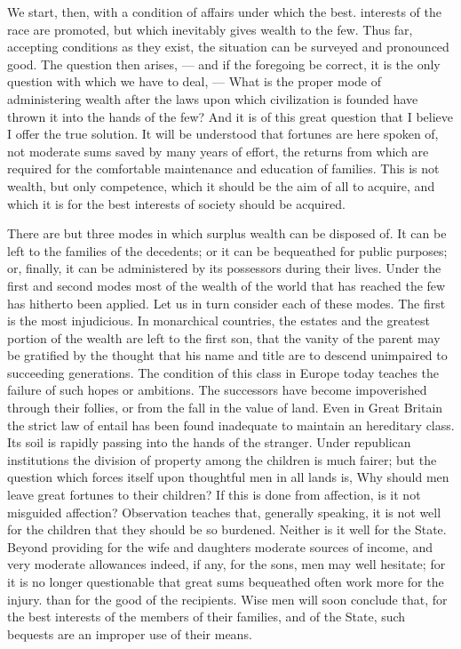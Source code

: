 \documentclass[11pt,openany]{book}
\begin{document}
We start, then, with a condition of affairs under which the best. interests of the race are promoted, but which inevitably gives wealth to the few. Thus far, accepting conditions as they exist, the situation can be surveyed and pronounced good. The question then arises, --- and if the foregoing be correct, it is the only question with which we have to deal, --- What is the proper mode of administering wealth after the laws upon which civilization is founded have thrown it into the hands of the few? And it is of this great question that I believe I offer the true solution. It will be understood that fortunes are here spoken of, not moderate sums saved by many years of effort, the returns from which are required for the comfortable maintenance and education of families. This is not wealth, but only competence, which it should be the aim of all to acquire, and which it is for the best interests of society should be acquired.

There are but three modes in which surplus wealth can be disposed of. It can be left to the families of the decedents; or it can be bequeathed for public purposes; or, finally, it can be administered by its possessors during their lives. Under the first and second modes most of the wealth of the world that has reached the few has hitherto been applied. Let us in turn consider each of these modes. The first is the most injudicious. In monarchical countries, the estates and the greatest portion of the wealth are left to the first son, that the vanity of the parent may be gratified by the thought that his name and title are to descend unimpaired to succeeding generations. The condition of this class in Europe today teaches the failure of such hopes or ambitions. The successors have become impoverished through their follies, or from the fall in the value of land. Even in Great Britain the strict law of entail has been found inadequate to maintain an hereditary class. Its soil is rapidly passing into the hands of the stranger. Under republican institutions the division of property among the children is much fairer; but the question which forces itself upon thoughtful men in all lands is, Why should men leave great fortunes to their children? If this is done from affection, is it not misguided affection? Observation teaches that, generally speaking, it is not well for the children that they should be so burdened. Neither is it well for the State. Beyond providing for the wife and daughters moderate sources of income, and very moderate allowances indeed, if any, for the sons, men may well hesitate; for it is no longer questionable that great sums bequeathed often work more for the injury. than for the good of the recipients. Wise men will soon conclude that, for the best interests of the members of their families, and of the State, such bequests are an improper use of their means.
\end{document}
